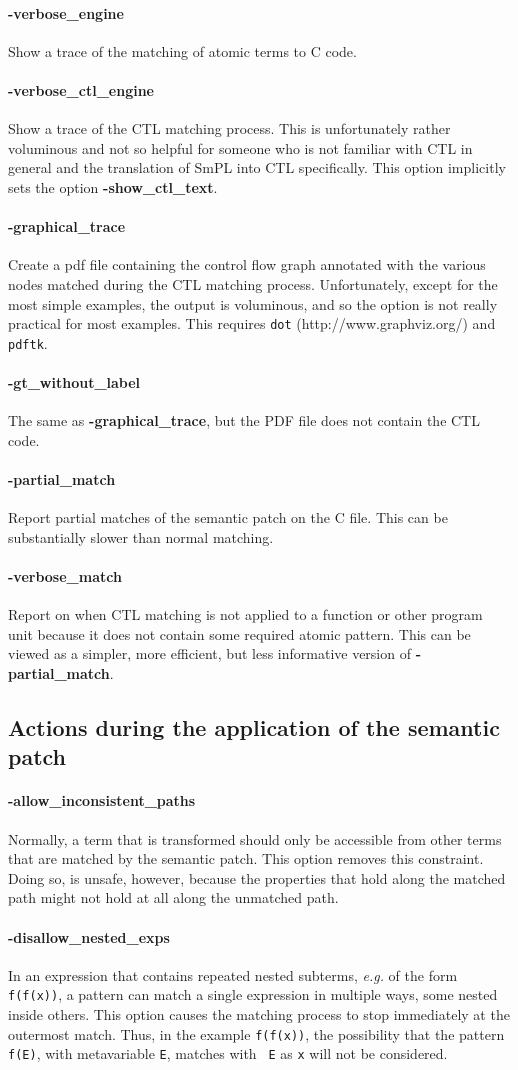 \documentclass{article}
\newcommand{\normal}[2]{\paragraph*{\makebox[0in][r]{\BigLowerDiamond\,\,} {{#1}}} {#2}}
\newcommand{\rare}[2]{\paragraph*{\makebox[0in][r]{\BigDiamondshape\,\,} {{#1}}} {#2}}
\begin{document}
\normal{-verbose\_engine}{Show a trace of the matching of atomic terms to C
  code.}

\rare{-verbose\_ctl\_engine}{Show a trace of the CTL matching process.
  This is unfortunately rather voluminous and not so helpful for someone
  who is not familiar with CTL in general and the translation of SmPL into
  CTL specifically.  This option implicitly sets the option {\bf
    -show\_ctl\_text}.}

\rare{-graphical\_trace}{Create a pdf file containing the control flow
  graph annotated with the various nodes matched during the CTL matching
  process.  Unfortunately, except for the most simple examples, the output
  is voluminous, and so the option is not really practical for most
  examples.  This requires {\tt dot} (http://www.graphviz.org/) and {\tt
  pdftk}.}

\rare{-gt\_without\_label}{The same as {\bf -graphical\_trace}, but the PDF
  file does not contain the CTL code.}

\rare{-partial\_match}{
Report partial matches of the semantic patch on the C file.  This can
  be substantially slower than normal matching.}

\rare{-verbose\_match}{
Report on when CTL matching is not applied to a function or other program
unit because it does not contain some required atomic pattern.
This can be viewed as a simpler, more efficient, but less informative
version of {\bf -partial\_match}.}

\subsection{Actions during the application of the semantic patch}

\rare{-allow\_inconsistent\_paths}{Normally, a term that is transformed
  should only be accessible from other terms that are matched by the
  semantic patch.  This option removes this constraint.  Doing so, is
  unsafe, however, because the properties that hold along the matched path
  might not hold at all along the unmatched path.}

\rare{-disallow\_nested\_exps}{In an expression that contains repeated
  nested subterms, {\em e.g.} of the form {\tt f(f(x))}, a pattern can
  match a single expression in multiple ways, some nested inside others.
  This option causes the matching process to stop immediately at the
  outermost match.  Thus, in the example {\tt f(f(x))}, the possibility
  that the pattern {\tt f(E)}, with metavariable {\tt E}, matches with {\tt
    E} as {\tt x} will not be considered.}
\end{document}
